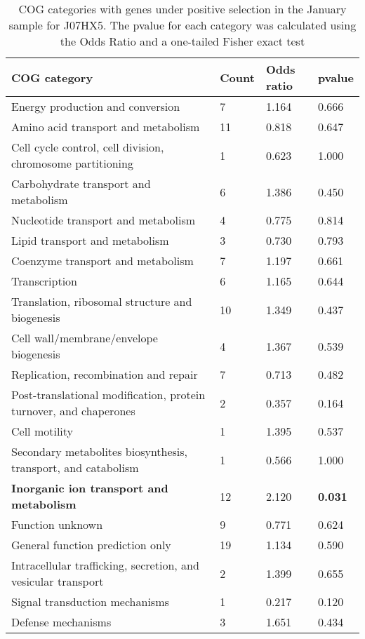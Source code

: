 \clearpage
\begin{table}[]
\footnotesize 
	\tabcolsep=0.11cm 
\caption{COG categories with genes under positive selection in the January sample for J07HX5. The pvalue for each category was calculated using the Odds Ratio and a one-tailed Fisher exact test} 
\begin{tabularx}{\textwidth}{L{6cm}R{2cm}R{2cm}R{2cm}} 
\hline 
\textbf{COG category} & \textbf{Count} & \textbf{Odds ratio} & \textbf{pvalue} \\ 
\hline 
Energy production and conversion & 7 & 1.164 & 0.666 \\ 
Amino acid transport and metabolism & 11 & 0.818 & 0.647 \\ 
Cell cycle control, cell division, chromosome partitioning & 1 & 0.623 & 1.000 \\ 
Carbohydrate transport and metabolism & 6 & 1.386 & 0.450 \\ 
Nucleotide transport and metabolism & 4 & 0.775 & 0.814 \\ 
Lipid transport and metabolism & 3 & 0.730 & 0.793 \\ 
Coenzyme transport and metabolism & 7 & 1.197 & 0.661 \\ 
Transcription & 6 & 1.165 & 0.644 \\ 
Translation, ribosomal structure and biogenesis & 10 & 1.349 & 0.437 \\ 
Cell wall/membrane/envelope biogenesis & 4 & 1.367 & 0.539 \\ 
Replication, recombination and repair & 7 & 0.713 & 0.482 \\ 
Post-translational modification, protein turnover, and chaperones & 2 & 0.357 & 0.164 \\ 
Cell motility & 1 & 1.395 & 0.537 \\ 
Secondary metabolites biosynthesis, transport, and catabolism & 1 & 0.566 & 1.000 \\ 
\textbf{Inorganic ion transport and metabolism} & 12 & 2.120 & \textbf{0.031} \\ 
Function unknown & 9 & 0.771 & 0.624 \\ 
General function prediction only & 19 & 1.134 & 0.590 \\ 
Intracellular trafficking, secretion, and vesicular transport & 2 & 1.399 & 0.655 \\ 
Signal transduction mechanisms & 1 & 0.217 & 0.120 \\ 
Defense mechanisms & 3 & 1.651 & 0.434 \\ 
\end{tabularx} 
\label{January_COG_Selection_J07HX5} 
 \end{table} 

